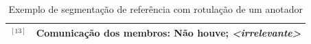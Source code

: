 \begin{table}[!h]
\begin{tabular}{|p{0.2cm}p{}|}
$^{[13]}$ &
	Comunicação dos membros: Não houve;
	\textit{<irrelevante>} 
\\ \hline










	\end{tabular}
	\caption{Exemplo de segmentação de referência com rotulação de um anotador}
	\label{tab:segmentacaoreferencia}
\end{table}









